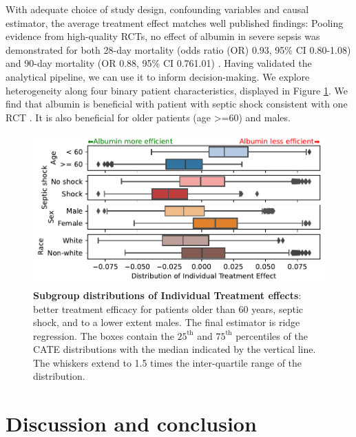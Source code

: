 \documentclass[10pt,letterpaper]{article}
\begin{document}
With adequate choice of study design, confounding variables and causal
estimator, the average treatment effect matches well published findings:
Pooling evidence from high-quality RCTs, no effect of albumin in severe
sepsis was demonstrated for both 28-day mortality (odds ratio (OR) 0.93,
95\% CI 0.80-1.08) and 90-day mortality (OR 0.88, 95\% CI 0.761.01)
\cite{xu2014comparison}.
%
Having validated the analytical pipeline, we can use it to inform
decision-making. We explore
heterogeneity along four binary patient characteristics, displayed in Figure
\ref{fig:albumin_for_sepsis:cate_results}. We find that albumin is beneficial
with patient with septic shock consistent with one
RCT  \cite{caironi2014albumin}. It is also beneficial for older patients (age >=60) and males.

\begin{figure}[h!]
  \begin{minipage}{.4\linewidth}
    \caption{\textbf{Subgroup distributions of Individual Treatment
        effects}:
      better treatment efficacy for patients older than 60 years, septic shock,
      and to a lower extent males. The final estimator is ridge regression. The
      boxes contain the $25^\text{th}$ and $75^\text{th}$ percentiles of the CATE
      distributions with the median indicated by the vertical line. The whiskers
      extend to 1.5 times the inter-quartile range of the
      distribution.}\label{fig:albumin_for_sepsis:cate_results}
  \end{minipage}%
  \hfill%
  \begin{minipage}{.6\linewidth}
    \includegraphics[width=\linewidth]{img/boxplot_est__DML__nuisances__Forests__final_Ridge.pdf}
  \end{minipage}%
\end{figure}


\section*{Discussion and conclusion}\label{sec:discussion}
\end{document}
